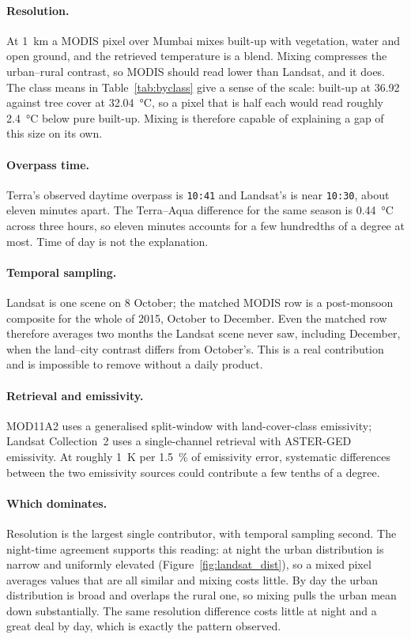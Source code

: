 \documentclass[11pt,a4paper]{article}
\begin{document}
\paragraph{Resolution.} At \SI{1}{\kilo\metre} a MODIS pixel over
Mumbai mixes built-up with vegetation, water and open ground, and the
retrieved temperature is a blend. Mixing compresses the urban--rural
contrast, so MODIS should read lower than Landsat, and it does. The
class means in Table~\ref{tab:byclass} give a sense of the scale:
built-up at \SI{36.92}{} against tree cover at
\SI{32.04}{\degreeCelsius}, so a pixel that is half each would read
roughly \SI{2.4}{\degreeCelsius} below pure built-up. Mixing is
therefore capable of explaining a gap of this size on its own.

\paragraph{Overpass time.} Terra's observed daytime overpass is
\texttt{10:41} and Landsat's is near \texttt{10:30}, about eleven
minutes apart. The Terra--Aqua difference for the same season is
\SI{0.44}{\degreeCelsius} across three hours, so eleven minutes
accounts for a few hundredths of a degree at most. Time of day is not
the explanation.

\paragraph{Temporal sampling.} Landsat is one scene on 8 October;
the matched MODIS row is a post-monsoon composite for the whole of
2015, October to December. Even the matched row therefore averages two
months the Landsat scene never saw, including December, when the
land--city contrast differs from October's. This is a real
contribution and is impossible to remove without a daily product.

\paragraph{Retrieval and emissivity.} MOD11A2 uses a generalised
split-window with land-cover-class emissivity; Landsat Collection~2
uses a single-channel retrieval with ASTER-GED emissivity. At roughly
\SI{1}{\kelvin} per \SI{1.5}{\percent} of emissivity error, systematic
differences between the two emissivity sources could contribute a few
tenths of a degree.

\paragraph{Which dominates.} Resolution is the largest single
contributor, with temporal sampling second. The night-time agreement
supports this reading: at night the urban distribution is narrow and
uniformly elevated (Figure~\ref{fig:landsat_dist}), so a mixed pixel
averages values that are all similar and mixing costs little. By day
the urban distribution is broad and overlaps the rural one, so mixing
pulls the urban mean down substantially. The same resolution
difference costs little at night and a great deal by day, which is
exactly the pattern observed.
\end{document}
